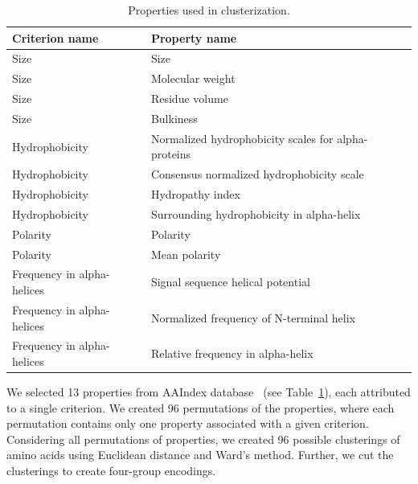 \documentclass[fleqn,10pt,twoside]{gcb15submission}
\begin{document}
\begin{table}[ht]
\centering
\begin{tabular}{ll}
  \toprule
Criterion name & Property name \\ 
  \midrule
Size & Size \\ 
   \rowcolor[gray]{0.85}Size & Molecular weight \\ 
  Size & Residue volume~\citep{1973goldsackcontribution} \\ 
   \rowcolor[gray]{0.85}Size & Bulkiness~\citep{1968zimmermanthe} \\ 
  Hydrophobicity & Normalized hydrophobicity scales for alpha-proteins~\citep{1992cidhydrophobicity} \\ 
   \rowcolor[gray]{0.85}Hydrophobicity & Consensus normalized hydrophobicity scale~\citep{1984eisenbergthreedimensional} \\ 
  Hydrophobicity & Hydropathy index~\citep{1982kytea} \\ 
   \rowcolor[gray]{0.85}Hydrophobicity & Surrounding hydrophobicity in alpha-helix~\citep{1980ponnuswamyhydrophobic} \\ 
  Polarity & Polarity~\citep{1974granthamamino} \\ 
   \rowcolor[gray]{0.85}Polarity & Mean polarity~\citep{1988radzickainfluences} \\ 
  Frequency in alpha-helices & Signal sequence helical potential~\citep{1982argosstructural} \\ 
   \rowcolor[gray]{0.85}Frequency in alpha-helices & Normalized frequency of N-terminal helix \\ 
  Frequency in alpha-helices & Relative frequency in alpha-helix~\citep{1990prabhakaranthe} \\ 
   \bottomrule
\end{tabular}
\caption{Properties used in clusterization.} 
\label{tab:aaprop}
\end{table}

We selected 13 properties from AAIndex database~\citep{2008kawashimaaaindex} (see Table~\ref{tab:aaprop}), each attributed to a single criterion. We created 96 permutations of the properties, where each permutation contains only one property associated with a given criterion. Considering all permutations of properties, we created 96 possible clusterings of amino acids using Euclidean distance and Ward's method. Further, we cut the clusterings to create four-group encodings.
\end{document}
